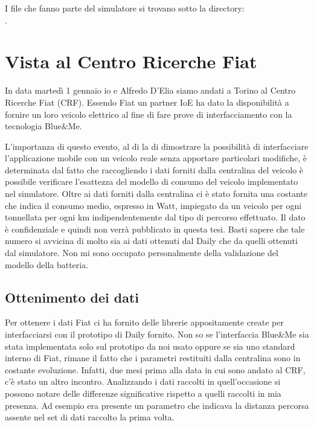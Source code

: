 I file che fanno parte del simulatore si trovano sotto la directory:\\ . 

\chapter{Vista al Centro Ricerche Fiat}\label{app:crf}

In data martedì 1 gennaio io e Alfredo D'Elia siamo andati a Torino al Centro Ricerche Fiat (CRF). Essendo Fiat un partner IoE ha dato la disponibilità a fornire un loro veicolo elettrico al fine di fare prove di interfacciamento con la tecnologia Blue\&{}Me.

L'importanza di questo evento, al di la di dimostrare la possibilità di interfacciare l'applicazione mobile con un veicolo reale senza apportare particolari modifiche, è determinata dal fatto che raccogliendo i dati forniti dalla centralina del veicolo è possibile verificare l'esattezza del modello di consumo del veicolo implementato nel simulatore. Oltre ai dati forniti dalla centralina ci è stato fornita una costante che indica il consumo medio, espresso in Watt, impiegato da un veicolo per ogni tonnellata per ogni km indipendentemente dal tipo di percorso effettuato. Il dato è confidenziale e quindi non verrà pubblicato in questa tesi. Basti sapere che tale numero si avvicina di molto sia ai dati ottenuti dal Daily che da quelli ottenuti dal simulatore. Non mi sono occupato personalmente della validazione del modello della batteria.

\section{Ottenimento dei dati}

Per ottenere i dati Fiat ci ha fornito delle librerie appositamente create per interfacciarsi con il prototipo di Daily fornito. Non so se l'interfaccia Blue\&{}Me sia stata implementata solo sul prototipo da noi usato oppure se sia uno standard interno di Fiat, rimane il fatto che i parametri restituiti dalla centralina sono in costante evoluzione. Infatti, due mesi prima alla data in cui sono andato al CRF, c'è stato un altro incontro. Analizzando i dati raccolti in quell'occasione si possono notare delle differenze significative rispetto a quelli raccolti in mia presenza. Ad esempio era presente un parametro che indicava la distanza percorsa assente nel set di dati raccolto la prima volta.


